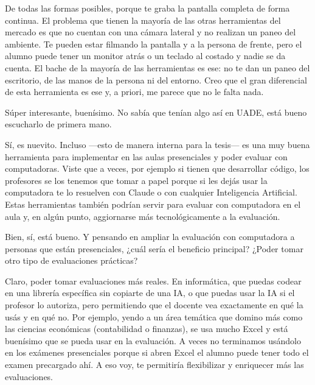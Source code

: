 \begin{description}[leftmargin=0cm, labelsep=0.5cm, style=nextline]
\item[\textbf{Entrevistado:}] De todas las formas posibles, porque te graba la pantalla completa de forma continua. El problema que tienen la mayoría de las otras herramientas del mercado es que no cuentan con una cámara lateral y no realizan un paneo del ambiente. Te pueden estar filmando la pantalla y a la persona de frente, pero el alumno puede tener un monitor atrás o un teclado al costado y nadie se da cuenta. El bache de la mayoría de las herramientas es ese: no te dan un paneo del escritorio, de las manos de la persona ni del entorno. Creo que el gran diferencial de esta herramienta es ese y, a priori, me parece que no le falta nada.
\item[\textbf{Entrevistador:}] Súper interesante, buenísimo. No sabía que tenían algo así en UADE, está bueno escucharlo de primera mano.
\item[\textbf{Entrevistado:}] Sí, es nuevito. Incluso ---esto de manera interna para la tesis--- es una muy buena herramienta para implementar en las aulas presenciales y poder evaluar con computadoras. Viste que a veces, por ejemplo si tienen que desarrollar código, los profesores se los tenemos que tomar a papel porque si les dejás usar la computadora te lo resuelven con Claude o con cualquier Inteligencia Artificial. Estas herramientas también podrían servir para evaluar con computadora en el aula y, en algún punto, aggiornarse más tecnológicamente a la evaluación.
\item[\textbf{Entrevistador:}] Bien, sí, está bueno. Y pensando en ampliar la evaluación con computadora a personas que están presenciales, ¿cuál sería el beneficio principal? ¿Poder tomar otro tipo de evaluaciones prácticas?
\item[\textbf{Entrevistado:}] Claro, poder tomar evaluaciones más reales. En informática, que puedas codear en una librería específica sin copiarte de una IA, o que puedas usar la IA si el profesor lo autoriza, pero permitiendo que el docente vea exactamente en qué la usás y en qué no. Por ejemplo, yendo a un área temática que domino más como las ciencias económicas (contabilidad o finanzas), se usa mucho Excel y está buenísimo que se pueda usar en la evaluación. A veces no terminamos usándolo en los exámenes presenciales porque si abren Excel el alumno puede tener todo el examen precargado ahí. A eso voy, te permitiría flexibilizar y enriquecer más las evaluaciones.

\end{description}
